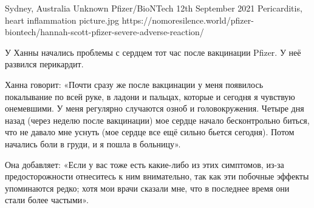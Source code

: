 {Sydney, Australia}
{Unknown}
{Pfizer/BioNTech}
{12th September 2021}
{Pericarditis, heart inflammation}
{picture.jpg}
{https://nomoresilence.world/pfizer-biontech/hannah-scott-pfizer-severe-adverse-reaction/}
{

У Ханны начались проблемы с сердцем тот час после вакцинации Pfizer. У неё
развился перикардит.

Ханна говорит: «Почти сразу же после вакцинации у меня появилось покалывание по
всей руке, в ладони и пальцах, которые и сегодня я чувствую онемевшими. У меня
регулярно случаются озноб и головокружения. Четыре дня назад (через неделю после
вакцинации) мое сердце начало бесконтрольно биться, что не давало мне уснуть
(мое сердце все ещё сильно бьется сегодня). Потом начались боли в груди, и я
пошла в больницу».

Она добавляет: «Если у вас тоже есть какие-либо из этих симптомов, из-за
предосторожности отнеситесь к ним внимательно, так как эти побочные эффекты
упоминаются редко; хотя мои врачи сказали мне, что в последнее время они стали
более частыми».

}
